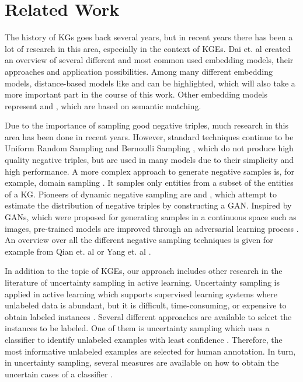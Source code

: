 \section{Related Work} 
\label{sec:relatedwork}

The history of \acp{KG} goes back several years, but in recent years there has been a lot of research in this area, especially in the context of \acp{KGE}.  
Dai et. al \cite{electronics9050750} created an overview of several different and most common used embedding models, their approaches and application possibilities.
Among many different embedding models, distance-based models like \transe \cite{TransE} and \transd \cite{TransD} can be highlighted, which will also take a more important part in the course of this work.
Other embedding models represent \distmult \cite{DistMult} and \complex \cite{ComplEx}, which are based on semantic matching. 

Due to the importance of sampling good negative triples, much research in this area has been done in recent years.
However, standard techniques continue to be Uniform Random Sampling \cite{TransE} and Bernoulli Sampling \cite{TransH}, which do not produce high quality negative triples, but are used in many models due to their simplicity and high performance.  
A more complex approach to generate negative samples is, for example, domain sampling \cite{domainSampling}.
It samples only entities from a subset of the entities of a \ac{KG}.
Pioneers of dynamic negative sampling are \kbgan \cite{cai2017kbgan} and \igan \cite{IGAN}, which attempt to estimate the distribution of negative triples by constructing a \ac{GAN}.
Inspired by \acp{GAN}, which were proposed for generating samples in a continuous space such as images, pre-trained models are improved through an adversarial learning process \cite{cai2017kbgan}.
An overview over all the different negative sampling techniques is given for example from Qian et. al \cite{qiannegative} or Yang et. al \cite{MCNS}.

In addition to the topic of \acp{KGE}, our approach includes other research in the literature of uncertainty sampling in active learning.
Uncertainty sampling is applied in active learning which supports supervised learning systems where unlabeled data is abundant, but it is difficult, time-consuming, or expensive to obtain labeled instances \cite{Settles2009ActiveLL}.
Several different approaches are available to select the instances to be labeled.
One of them is uncertainty sampling which uses a classifier to identify unlabeled examples with least confidence \cite{5272205}.
Therefore, the most informative unlabeled examples are selected for human annotation.
In turn, in uncertainty sampling, several measures are available on how to obtain the uncertain cases of a classifier \cite{nguyen2021howtomeasure}.